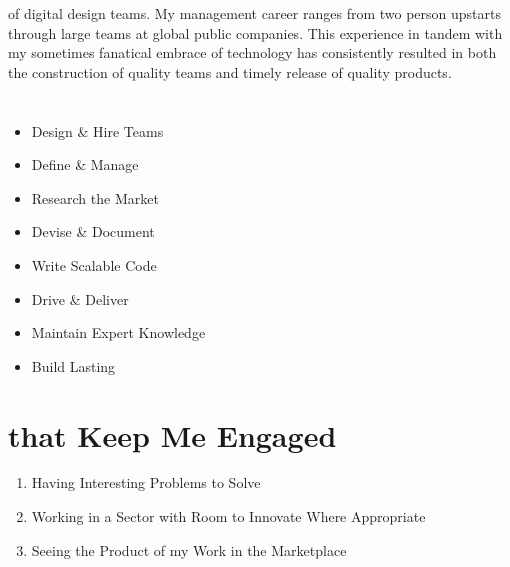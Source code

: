 \maketitle

\displayaddress {} of digital design teams.  My management career ranges from two person upstarts through large teams at global public companies.  This experience in tandem with my sometimes fanatical embrace of technology has consistently resulted in both the construction of quality teams and timely release of quality products.

\section{}
\begin{itemize}
\itemsep-0.1em
\item{Design \& Hire Teams }
\item{Define \& Manage }
\item{Research the Market }
\item{Devise \& Document }
\item{Write Scalable Code }
\item{Drive \& Deliver }
\item{Maintain Expert Knowledge }
\item{Build Lasting }
\end{itemize}
\smallskip

\section{ that Keep Me Engaged}
\begin{enumerate}
\itemsep-0.1em
\item{Having Interesting Problems to Solve}
\item{Working in a Sector with Room to Innovate Where Appropriate}
\item{Seeing the Product of my Work in the Marketplace}
\end{enumerate}
\smallskip

